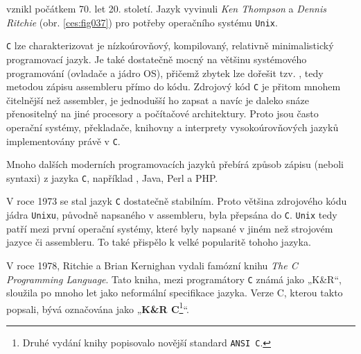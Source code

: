     \wikiANSIC vznikl počátkem 70. let 20. století. Jazyk vyvinuli \emph{Ken Thompson} a 
    \emph{Dennis Ritchie} (obr. \ref{ces:fig037}) pro potřeby operačního systému \texttt{Unix}.  
    
    \texttt{C} lze charakterizovat je nízkoúrovňový, kompilovaný, relativně minimalistický 
    programovací jazyk. Je také dostatečně mocný na většinu systémového programování (ovladače a 
    jádro OS), přičemž zbytek lze dořešit tzv. \wikiInlineASM, tedy metodou zápisu assembleru přímo 
    do kódu. Zdrojový kód \texttt{C} je přitom mnohem čitelnější než assembler, je jednodušší ho 
    zapsat a navíc je daleko snáze přenositelný na jiné procesory a počítačové architektury. Proto 
    jsou často operační systémy, překladače, knihovny a interprety vysokoúrovňových jazyků 
    implementovány právě v \texttt{C}. 
    
    Mnoho dalších moderních programovacích jazyků přebírá způsob zápisu (neboli syntaxi) z jazyka 
    \texttt{C}, například \wikiCPP, Java, Perl a PHP.

    
    V roce 1973 se stal jazyk \texttt{C} dostatečně stabilním. Proto většina zdrojového kódu jádra 
    \texttt{Unixu}, původně napsaného v assembleru, byla přepsána do \texttt{C}. \texttt{Unix} tedy 
    patří mezi první operační systémy, které byly napsané v jiném než strojovém jazyce či 
    assembleru. To také přispělo k velké popularitě tohoho jazyka. 
    
    V roce 1978, Ritchie a Brian Kernighan vydali famózní knihu \emph{The C Programming Language}. 
    Tato kniha, mezi programátory \texttt{C} známá jako „K\&R“, sloužila po mnoho let jako 
    neformální specifikace jazyka. Verze C, kterou takto popsali, bývá označována jako 
    „\textbf{K\&R C}\footnote{Druhé vydání knihy popisovalo novější standard \texttt{ANSI C}.}“.
                        
